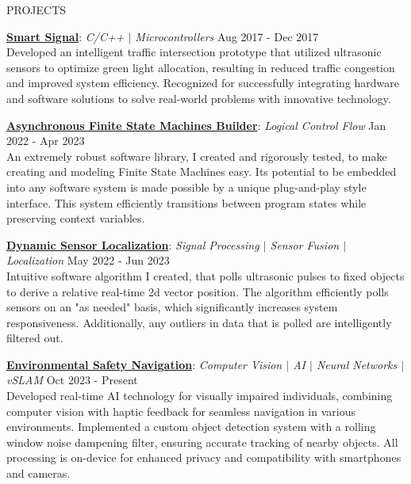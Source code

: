 \documentclass{resume} %
\begin{document}
\begin{rSection}{PROJECTS}
\vspace{-1.25em}
\item{\underline{\textbf{Smart Signal}}}: \textit{C/C++ $\vert$ Microcontrollers} \hfill {Aug 2017 - Dec 2017} \vspace{0.25em} \\
{Developed an intelligent traffic intersection prototype that utilized ultrasonic sensors to optimize green light allocation, resulting in reduced traffic congestion and improved system efficiency. Recognized for successfully integrating hardware and software solutions to solve real-world problems with innovative technology.}

\item{\underline{\textbf{Asynchronous Finite State Machines Builder}}}: \textit{Logical Control Flow} \hfill {Jan 2022 - Apr 2023} \vspace{0.25em} \\
{An extremely robust software library, I created and rigorously tested, to make creating and modeling Finite State Machines easy. Its potential to be embedded into any software system is made possible by a unique plug-and-play style interface. This system efficiently transitions between program states while preserving context variables.}

\item{\underline{\textbf{Dynamic Sensor Localization}}}: \textit{Signal Processing $\vert$ Sensor Fusion $\vert$ Localization} \hfill {May 2022 - Jun 2023} \vspace{0.25em}\\
{Intuitive software algorithm I created, that polls ultrasonic pulses to fixed objects to derive a relative real-time 2d vector position. The algorithm efficiently polls sensors on an "as needed" basis, which significantly increases system responsiveness. Additionally, any outliers in data that is polled are intelligently filtered out.}

\item{\underline{\textbf{Environmental Safety Navigation}}}: \textit{Computer Vision $\vert$ AI $\vert$ Neural Networks $\vert$ vSLAM} \hfill {Oct 2023 - Present} \vspace{0.25em}\\
{Developed real-time AI technology for visually impaired individuals, combining computer vision with haptic feedback for seamless navigation in various environments. Implemented a custom object detection system with a rolling window noise dampening filter, ensuring accurate tracking of nearby objects. All processing is on-device for enhanced privacy and compatibility with smartphones and cameras.}
\end{rSection} 
\end{document}
